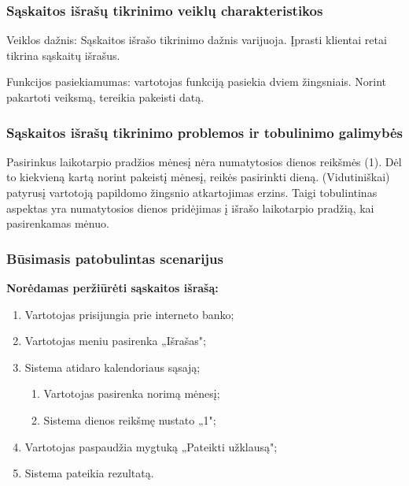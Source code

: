 \documentclass{VUMIFPSkursinis}
\begin{document}
\subsubsection{Sąskaitos išrašų tikrinimo veiklų charakteristikos}
Veiklos dažnis: Sąskaitos išrašo tikrinimo dažnis varijuoja. Įprasti klientai retai tikrina sąskaitų išrašus. 

Funkcijos pasiekiamumas: vartotojas funkciją pasiekia dviem žingsniais. Norint pakartoti veiksmą, tereikia pakeisti datą.
\subsubsection{Sąskaitos išrašų tikrinimo problemos ir tobulinimo galimybės}
Pasirinkus laikotarpio pradžios mėnesį nėra numatytosios dienos reikšmės (1). Dėl to kiekvieną kartą norint pakeistį mėnesį, reikės pasirinkti dieną. (Vidutiniškai) patyrusį vartotoją papildomo žingsnio atkartojimas erzins. Taigi tobulintinas aspektas yra numatytosios dienos pridėjimas į išrašo laikotarpio pradžią, kai pasirenkamas mėnuo.
\subsubsection{Būsimasis patobulintas scenarijus}
\begin{center}
	\textbf{Norėdamas peržiūrėti sąskaitos išrašą:}
\end{center}
\begin{enumerate}
	\item Vartotojas prisijungia prie interneto banko;
	\item Vartotojas meniu pasirenka „Išrašas";
	\item Sistema atidaro kalendoriaus sąsają;
	\begin{enumerate}
		\item Vartotojas pasirenka norimą mėnesį;
		\item Sistema dienos reikšmę nustato „1";
	\end{enumerate}
	\item Vartotojas paspaudžia mygtuką „Pateikti užklausą";
	\item Sistema pateikia rezultatą.
\end{enumerate}
\end{document}

